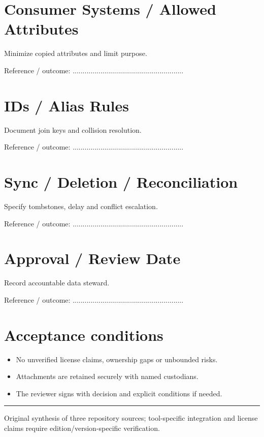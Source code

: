 \documentclass[10pt,letterpaper]{article}
\begin{document}
\section{Consumer Systems / Allowed Attributes}
Minimize copied attributes and limit purpose.\par
Reference / outcome: ........................................................\par
\section{IDs / Alias Rules}
Document join keys and collision resolution.\par
Reference / outcome: ........................................................\par
\section{Sync / Deletion / Reconciliation}
Specify tombstones, delay and conflict escalation.\par
Reference / outcome: ........................................................\par
\section{Approval / Review Date}
Record accountable data steward.\par
Reference / outcome: ........................................................\par
\section{Acceptance conditions}
\begin{itemize}
\item No unverified license claims, ownership gaps or unbounded risks.
\item Attachments are retained securely with named custodians.
\item The reviewer signs with decision and explicit conditions if needed.
\end{itemize}
\vfill\noindent\color{muted}\rule{\linewidth}{0.4pt}\par\scriptsize Original synthesis of three repository sources; tool-specific integration and license claims require edition/version-specific verification.\normalsize
\end{document}
